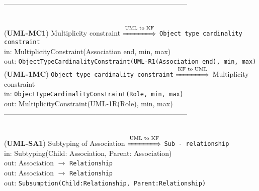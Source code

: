 \documentclass[sn-mathphys]{sn-jnl}
\begin{document}
{{------------------------------------------------------------------------------
\\ \

({\bf UML-MC1}) {Multiplicity constraint} $\overset{\text{UML to KF}}{\xLongrightarrow{\hspace*{1.4cm}}}$ {\tt Object type cardinality constraint}\\
\hspace*{0.3cm}in: {MultiplicityConstraint(Association end, min, max)} \\
\hspace*{0.5cm}out:  {\tt ObjectTypeCardinalityConstraint(UML-R1(Association end), min, max)}\\

({\bf UML-1MC}) {\tt Object type cardinality constraint} $\overset{\text{KF to UML}}{\xLongrightarrow{\hspace*{1.4cm}}}$ {Multiplicity constraint}\\
\hspace*{0.3cm}in: {\tt ObjectTypeCardinalityConstraint(Role, min, max)} \\
\hspace*{0.5cm}out:  {MultiplicityConstraint(UML-1R(Role), min, max)}\\

------------------------------------------------------------------------------
\\ \

({\bf UML-SA1}) {Subtyping of Association} $\overset{\text{UML to KF}}{\xLongrightarrow{\hspace*{1.4cm}}}$ {\tt Sub - relationship}\\
\hspace*{0.3cm}in: {Subtyping(Child: Association, Parent: Association)} \\
\hspace*{0.5cm}out:  {Association} $\rightarrow$ {\tt Relationship }\\
\hspace*{0.5cm}out:  {Association} $\rightarrow$ {\tt Relationship }\\
\hspace*{0.5cm}out:  {\tt Subsumption(Child:Relationship, Parent:Relationship)}\\

}}
\end{document}
